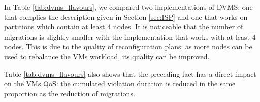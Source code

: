 In Table \ref{tab:dvms_flavours}, we compared two implementations of
DVMS: one that complies the description given in Section \ref{sec:ISP} and one
that works on partitions which contain at least 4 nodes. It is noticeable that
the number of migrations is slightly smaller with the implementation that works
with at least 4 nodes. This is due to the quality of reconfiguration plans: as
more nodes can be used to rebalance the VMs workload, its quality can be
improved.


Table \ref{tab:dvms_flavours} also shows that the preceding
fact has a direct impact on the VMs QoS: the cumulated violation duration
is reduced in the same proportion as the reduction of migrations.


